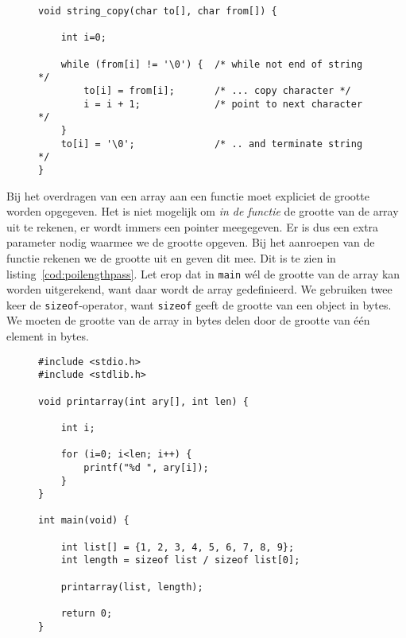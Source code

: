 \begin{figure}[!ht]
\begin{lstlisting}[caption=Functie voor het kopieren van een string met behulp van array's.,label=cod:poicopystrings2]
void string_copy(char to[], char from[]) {

    int i=0;

    while (from[i] != '\0') {  /* while not end of string */
        to[i] = from[i];       /* ... copy character */
        i = i + 1;             /* point to next character */
    }
    to[i] = '\0';              /* .. and terminate string */
}
\end{lstlisting}
\end{figure}

Bij het overdragen van een array aan een functie moet expliciet de grootte worden opgegeven. Het is niet mogelijk om \textsl{in de functie} de grootte van de array uit te rekenen, er wordt immers een pointer meegegeven. Er is dus een extra parameter nodig waarmee we de grootte opgeven. Bij het aanroepen van de functie rekenen we de grootte uit en geven dit mee. Dit is te zien in listing~\ref{cod:poilengthpass}. Let erop dat in \texttt{main} w\'el de grootte van de array kan worden uitgerekend, want daar wordt de array gedefinieerd. We gebruiken twee keer de \texttt{sizeof}-operator, want \texttt{sizeof} geeft de grootte van een object in bytes. We moeten de grootte van de array in bytes delen door de grootte van \'e\'en element in bytes.

\begin{figure}[!ht]
\begin{lstlisting}[caption=Meegeven van de grootte van een array.,label=cod:poilengthpass]
#include <stdio.h>
#include <stdlib.h>

void printarray(int ary[], int len) {

    int i;

    for (i=0; i<len; i++) {
        printf("%d ", ary[i]);
    }
}

int main(void) {

    int list[] = {1, 2, 3, 4, 5, 6, 7, 8, 9};
    int length = sizeof list / sizeof list[0];

    printarray(list, length);

    return 0;
}
\end{lstlisting}
\end{figure}

